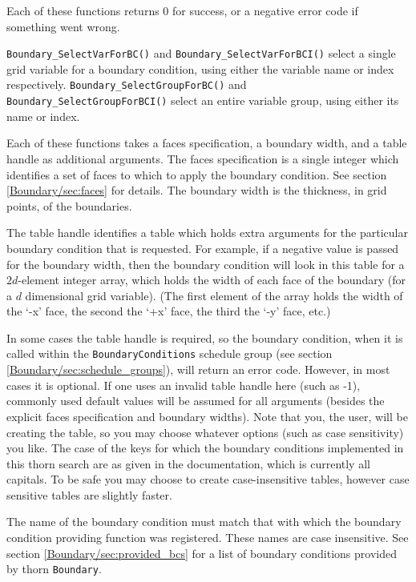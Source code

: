 \documentclass{article}
\begin{document}
Each of these functions returns 0 for success, or a negative error
code if something went wrong.

\verb|Boundary_SelectVarForBC()| and \verb|Boundary_SelectVarForBCI()|
select a single grid variable for a boundary condition,
using either the variable name or index respectively.
\verb|Boundary_SelectGroupForBC()| and \verb|Boundary_SelectGroupForBCI()|
select an entire variable group, using either its name or index.

Each of these functions takes a faces specification, a boundary width,
and a table handle as additional arguments.
The faces specification is a single integer which identifies a set of
faces to which to apply the boundary condition.  See section
\ref{Boundary/sec:faces} for details.  The boundary width is the thickness,
in grid points, of the boundaries.  

The table handle identifies a table which
holds extra arguments for the particular boundary condition that is
requested.  
For example, if a negative value is passed for the boundary width, then the
boundary condition will look in this table for a $2d$-element integer
array, which holds the width of each face of the boundary (for a $d$
dimensional grid variable).  (The first element of the array holds the
width of the `-x' face, the second the `+x' face, the third the `-y'
face, etc.)

In some cases the table handle is required, so the boundary condition,
when it is called within the \texttt{BoundaryConditions} schedule
group (see section \ref{Boundary/sec:schedule_groups}), will return
an error code.  However, in most cases it is optional.  If one uses
an invalid table handle here (such as -1), commonly used default
values will be assumed for all arguments (besides the explicit faces
specification and boundary widths).  Note that you, the user, will
be creating the table, so you may choose whatever options (such as
case sensitivity) you like.  The case of the keys for which the
boundary conditions implemented in this thorn search are as given
in the documentation, which is currently all capitals.  To be safe
you may choose to create case-insensitive tables, however case
sensitive tables are slightly faster.

The name of the boundary condition must match that with which the
boundary condition providing function was registered.  These names are
case insensitive.  See section \ref{Boundary/sec:provided_bcs} for a list of
boundary conditions provided by thorn \texttt{Boundary}.
\end{document}

